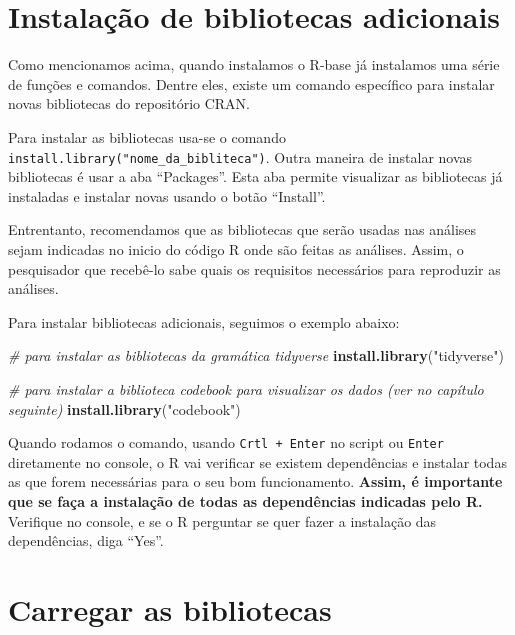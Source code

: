 \documentclass[
  brazil,
]{book}
\newenvironment{Shaded}{\begin{snugshade}}{\end{snugshade}}
\newcommand{\CommentTok}[1]{\textcolor[rgb]{0.56,0.35,0.01}{\textit{#1}}}
\newcommand{\KeywordTok}[1]{\textcolor[rgb]{0.13,0.29,0.53}{\textbf{#1}}}
\newcommand{\NormalTok}[1]{#1}
\newcommand{\StringTok}[1]{\textcolor[rgb]{0.31,0.60,0.02}{#1}}
\begin{document}
\hypertarget{instalauxe7uxe3o-de-bibliotecas-adicionais}{%
\section{Instalação de bibliotecas adicionais}\label{instalauxe7uxe3o-de-bibliotecas-adicionais}}

Como mencionamos acima, quando instalamos o R-base já instalamos uma série de funções e comandos. Dentre eles, existe um comando específico para instalar novas bibliotecas do repositório CRAN.

Para instalar as bibliotecas usa-se o comando \texttt{install.library("nome\_da\_bibliteca")}. Outra maneira de instalar novas bibliotecas é usar a aba ``Packages''. Esta aba permite visualizar as bibliotecas já instaladas e instalar novas usando o botão ``Install''.

Entrentanto, recomendamos que as bibliotecas que serão usadas nas análises sejam indicadas no inicio do código R onde são feitas as análises. Assim, o pesquisador que recebê-lo sabe quais os requisitos necessários para reproduzir as análises.

Para instalar bibliotecas adicionais, seguimos o exemplo abaixo:

\begin{Shaded}
\begin{Highlighting}[]
\CommentTok{# para instalar as bibliotecas da gramática tidyverse}
\KeywordTok{install.library}\NormalTok{(}\StringTok{"tidyverse"}\NormalTok{)}

\CommentTok{# para instalar a biblioteca codebook para visualizar os dados (ver no capítulo seguinte)}
\KeywordTok{install.library}\NormalTok{(}\StringTok{"codebook"}\NormalTok{)}
\end{Highlighting}
\end{Shaded}

Quando rodamos o comando, usando \texttt{Crtl\ +\ Enter} no script ou \texttt{Enter} diretamente no console, o R vai verificar se existem dependências e instalar todas as que forem necessárias para o seu bom funcionamento. \textbf{Assim, é importante que se faça a instalação de todas as dependências indicadas pelo R.} Verifique no console, e se o R perguntar se quer fazer a instalação das dependências, diga ``Yes''.

\hypertarget{carregar-as-bibliotecas}{%
\section{Carregar as bibliotecas}\label{carregar-as-bibliotecas}}
\end{document}
